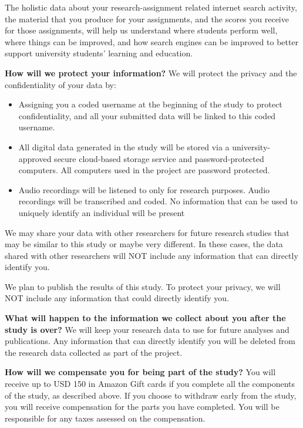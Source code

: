 \documentclass[letterpaper, nobind]{templates/ociamthesis}
\providecommand{\tightlist}{%
  \setlength{\itemsep}{0pt}\setlength{\parskip}{0pt}}
\begin{document}
The holistic data about your research-assignment related internet search activity, the material that you produce for your assignments, and the scores you receive for those assignments, will help us understand where students perform well, where things can be improved, and how search engines can be improved to better support university students' learning and education.

\textbf{How will we protect your information?}
We will protect the privacy and the confidentiality of your data by:

\begin{itemize}
\tightlist
\item
  Assigning you a coded username at the beginning of the study to protect confidentiality, and all your submitted data will be linked to this coded username.
\item
  All digital data generated in the study will be stored via a university-approved secure cloud-based storage service and password-protected computers. All computers used in the project are password protected.
\item
  Audio recordings will be listened to only for research purposes. Audio recordings will be transcribed and coded. No information that can be used to uniquely identify an individual will be present
\end{itemize}

We may share your data with other researchers for future research studies that may be similar to this study or maybe very different. In these cases, the data shared with other researchers will NOT include any information that can directly identify you.

We plan to publish the results of this study. To protect your privacy, we will NOT include any information that could directly identify you.

\textbf{What will happen to the information we collect about you after the study is over?}
We will keep your research data to use for future analyses and publications. Any information that can directly identify you will be deleted from the research data collected as part of the project.

\textbf{How will we compensate you for being part of the study?}
You will receive up to USD 150 in Amazon Gift cards if you complete all the components of the study, as described above. If you choose to withdraw early from the study, you will receive compensation for the parts you have completed. You will be responsible for any taxes assessed on the compensation.
\end{document}
